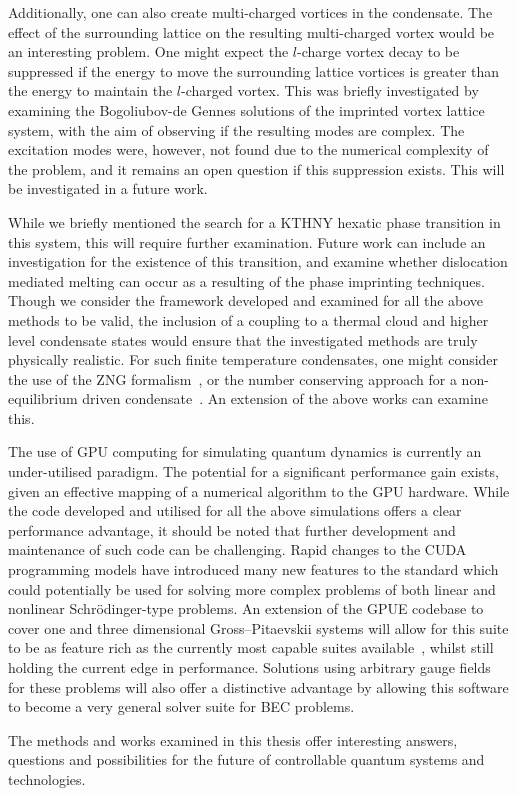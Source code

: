 Additionally, one can also create multi-charged vortices in the condensate. The effect of the surrounding lattice on the resulting multi-charged vortex would be an interesting problem. One might expect the $l$-charge vortex decay to be suppressed if the energy to move the surrounding lattice vortices is greater than the energy to maintain the $l$-charged vortex. This was briefly investigated by examining the Bogoliubov-de Gennes solutions of the imprinted vortex lattice system, with the aim of observing if the resulting modes are complex. The excitation modes were, however, not found due to the numerical complexity of the problem, and it remains an open question if this suppression exists. This will be investigated in a future work.


While we briefly mentioned the search for a KTHNY hexatic phase transition in this system, this will require further examination. Future work can include an investigation for the existence of this transition, and examine whether dislocation mediated melting can occur as a resulting of the phase imprinting techniques. Though we consider the framework developed and examined for all the above methods to be valid, the inclusion of a coupling to a thermal cloud and higher level condensate states would ensure that the investigated methods are truly physically realistic. For such finite temperature condensates, one might consider the use of the ZNG formalism~\cite{BK:Proukakis_finitetemp_2013}, or the number conserving approach for a non-equilibrium driven condensate~\cite{BEC:Billam_pra_2013}. An extension of the above works can examine this.

The use of GPU computing for simulating quantum dynamics is currently an under-utilised paradigm. The potential for a significant performance gain exists, given an effective mapping of a numerical algorithm to the GPU hardware. While the code developed and utilised for all the above simulations offers a clear performance advantage, it should be noted that further development and maintenance of such code can be challenging. Rapid changes to the CUDA programming models have introduced many new features to the standard which could potentially be used for solving more complex problems of both linear and nonlinear Schr\"odinger-type problems. An extension of the GPUE codebase to cover one and three dimensional Gross--Pitaevskii systems will allow for this suite to be as feature rich as the currently most capable suites available~\cite{NUM:Wittek_cpc_2013,NUM:GPElab_1}, whilst still holding the current edge in performance. Solutions using arbitrary gauge fields for these problems will also offer a distinctive advantage by allowing this software to become a very general solver suite for BEC problems.

The methods and works examined in this thesis offer interesting answers, questions and possibilities for the future of controllable quantum systems and technologies.
